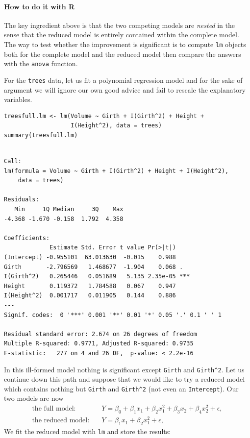 \documentclass[captions=tableheading]{scrbook}
\begin{document}
\paragraph*{How to do it with \textsf{R}}

The key ingredient above is that the two competing models are \emph{nested} in the sense that the reduced model is entirely contained within the complete model. The way to test whether the improvement is significant is to compute \texttt{lm} objects both for the complete model and the reduced model then compare the answers with the \texttt{anova} function.

\begin{example}
\label{exa:mlr-trees-poly-no-rescale}

For the \texttt{trees} data, let us fit a polynomial regression model and for the sake of argument we will ignore our own good advice and fail to rescale the explanatory variables. 


\begin{verbatim}
treesfull.lm <- lm(Volume ~ Girth + I(Girth^2) + Height + 
                   I(Height^2), data = trees)
summary(treesfull.lm)
\end{verbatim}


\begin{verbatim}
 
Call:
lm(formula = Volume ~ Girth + I(Girth^2) + Height + I(Height^2), 
    data = trees)

Residuals:
   Min     1Q Median     3Q    Max 
-4.368 -1.670 -0.158  1.792  4.358 

Coefficients:
             Estimate Std. Error t value Pr(>|t|)    
(Intercept) -0.955101  63.013630  -0.015    0.988    
Girth       -2.796569   1.468677  -1.904    0.068 .  
I(Girth^2)   0.265446   0.051689   5.135 2.35e-05 ***
Height       0.119372   1.784588   0.067    0.947    
I(Height^2)  0.001717   0.011905   0.144    0.886    
---
Signif. codes:  0 '***' 0.001 '**' 0.01 '*' 0.05 '.' 0.1 ' ' 1 

Residual standard error: 2.674 on 26 degrees of freedom
Multiple R-squared: 0.9771,	Adjusted R-squared: 0.9735 
F-statistic:   277 on 4 and 26 DF,  p-value: < 2.2e-16
\end{verbatim}

In this ill-formed model nothing is significant except \texttt{Girth} and \texttt{Girth\textasciicircum{}2}. Let us continue down this path and suppose that we would like to try a reduced model which contains nothing but \texttt{Girth} and \texttt{Girth\textasciicircum{}2} (not even an \texttt{Intercept}). Our two models are now
\begin{align*} 
\mbox{the full model:} & \quad Y=\beta_{0}+\beta_{1}x_{1}+\beta_{2}x_{1}^{2}+\beta_{3}x_{2}+\beta_{4}x_{2}^{2}+\epsilon,\\
\mbox{the reduced model:} & \quad Y=\beta_{1}x_{1}+\beta_{2}x_{1}^{2}+\epsilon,
\end{align*}
We fit the reduced model with \texttt{lm} and store the results:



\end{example}
\end{document}
